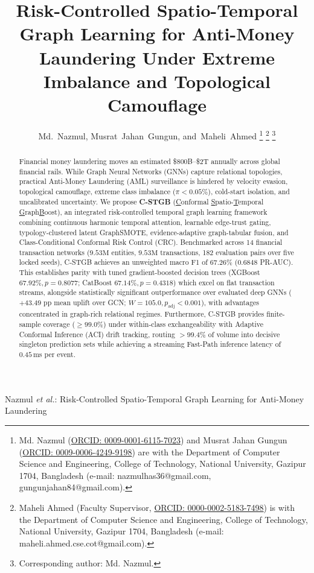 \documentclass[lettersize,journal]{IEEEtran}
\begin{document}
\title{Risk-Controlled Spatio-Temporal Graph Learning for Anti-Money Laundering Under Extreme Imbalance and Topological Camouflage}

\author{Md.~Nazmul,
       Musrat~Jahan~Gungun,
       and~Maheli~Ahmed%
\thanks{Md. Nazmul (\href{https://orcid.org/0009-0001-6115-7023}{ORCID: 0009-0001-6115-7023}) and Musrat Jahan Gungun (\href{https://orcid.org/0009-0006-4249-9198}{ORCID: 0009-0006-4249-9198}) are with the Department of Computer Science and Engineering, College of Technology, National University, Gazipur 1704, Bangladesh (e-mail: nazmulhas36@gmail.com, gungunjahan84@gmail.com).}%
\thanks{Maheli Ahmed (Faculty Supervisor, \href{https://orcid.org/0000-0002-5183-7498}{ORCID: 0000-0002-5183-7498}) is with the Department of Computer Science and Engineering, College of Technology, National University, Gazipur 1704, Bangladesh (e-mail: maheli.ahmed.cse.cot@gmail.com).}%
\thanks{Corresponding author: Md. Nazmul.}%
}

%
{Nazmul \MakeLowercase{\textit{et al.}}: Risk-Controlled Spatio-Temporal Graph Learning for Anti-Money Laundering}

\maketitle

\begin{abstract}
Financial money laundering moves an estimated \$800B--\$2T annually across global financial rails. While Graph Neural Networks (GNNs) capture relational topologies, practical Anti-Money Laundering (AML) surveillance is hindered by velocity evasion, topological camouflage, extreme class imbalance ($\pi < 0.05\%$), cold-start isolation, and uncalibrated uncertainty. We propose \textbf{C-STGB} (\underline{C}onformal \underline{S}patio-\underline{T}emporal \underline{G}raph\underline{B}oost), an integrated risk-controlled temporal graph learning framework combining continuous harmonic temporal attention, learnable edge-trust gating, typology-clustered latent GraphSMOTE, evidence-adaptive graph-tabular fusion, and Class-Conditional Conformal Risk Control (CRC). Benchmarked across 14 financial transaction networks ($9.53\text{M}$ entities, $9.53\text{M}$ transactions, 182 evaluation pairs over five locked seeds), C-STGB achieves an unweighted macro F1 of $67.26\%$ ($0.6848$ PR-AUC). This establishes parity with tuned gradient-boosted decision trees (XGBoost $67.92\%, p=0.8077$; CatBoost $67.14\%, p=0.4318$) which excel on flat transaction streams, alongside statistically significant outperformance over evaluated deep GNNs ($+43.49\text{ pp}$ mean uplift over GCN; $W=105.0, p_{\text{adj}} < 0.001$), with advantages concentrated in graph-rich relational regimes. Furthermore, C-STGB provides finite-sample coverage ($\ge 99.0\%$) under within-class exchangeability with Adaptive Conformal Inference (ACI) drift tracking, routing $>99.4\%$ of volume into decisive singleton prediction sets while achieving a streaming Fast-Path inference latency of $0.45$\,ms per event.
\end{abstract}
\end{document}
